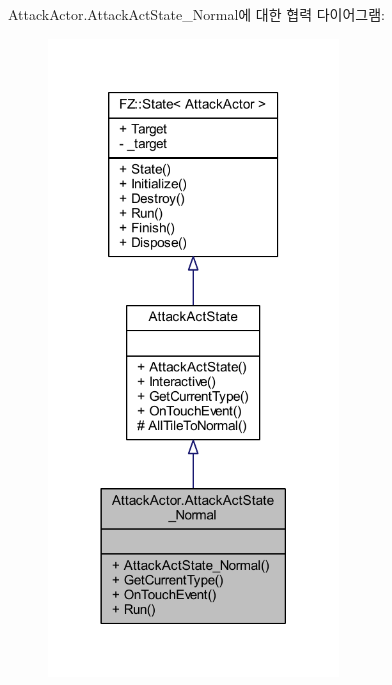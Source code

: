 Attack\+Actor.\+Attack\+Act\+State\+\_\+\+Normal에 대한 협력 다이어그램\+:
\nopagebreak
\begin{figure}[H]
\begin{center}
\leavevmode
\includegraphics[width=218pt]{class_attack_actor_1_1_attack_act_state___normal__coll__graph}
\end{center}
\end{figure}
